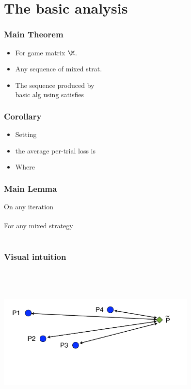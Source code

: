 \documentclass{beamer}
\begin{document}
\section{The basic analysis}

\begin{frame}
\frametitle{Main Theorem}
\begin{itemize}
\item For  game matrix $\M$.
\item Any sequence of mixed strat. 
\item The sequence  produced by \\
basic alg using  satisfies
\end{itemize}
\end{frame}

\begin{frame}
\frametitle{Corollary}
\begin{itemize}
\item Setting 
\item the average per-trial loss is
\item Where 
\R{\[
\delt = \sqrt{2 \ln n \over T} + {\ln n \over T} 
= O\paren{\sqrt{\frac{\ln n}{T}}}.
\]}
\end{itemize}
\end{frame}

\begin{frame}
\frametitle{Main Lemma}

On any iteration 
\\ ~ \\ \pause
For any mixed strategy \R{$\Pref$}
\\ ~ \\ \pause
{}
\end{frame}

\begin{frame}
\frametitle{Visual intuition}

\pause \\ ~ \\ ~ \\
\includegraphics[width=10cm]{figures/divergenceAnalysis.pdf}
\end{frame}
\end{document}
